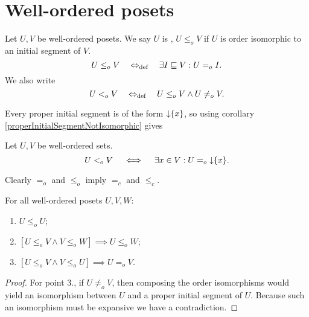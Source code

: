 \section{Well-ordered posets}
\begin{definition}
Let $U,V$ be well-ordered posets. We say $U$ is , $U\leq_o V$ if $U$ is order isomorphic to an initial segment of $V$.
\[ U\leq_o V \quad\Leftrightarrow_{\text{def}}\quad \exists I\sqsubseteq V: U =_o I. \]
We also write
\[ U <_o V \quad\Leftrightarrow_{\text{def}}\quad U\leq_o V \land U\neq_o V. \]
\end{definition}
Every proper initial segment is of the form $\operatorname{\downarrow}\{x\}$, so using corollary \ref{properInitialSegmentNotIsomorphic} gives
\begin{lemma}
Let $U,V$ be well-ordered sets.
\[ U <_o V \quad \iff \quad \exists x\in V: U =_o \operatorname{\downarrow}\{x\}. \]
\end{lemma}

Clearly $=_o$ and $\leq_o$ imply $=_c$ and $\leq_c$.

\begin{lemma} \label{preorderingWosets}
For all well-ordered posets $U,V,W$:
\begin{enumerate}
\item $U \leq_o U$;
\item $[U\leq_o V \land V\leq_o W] \implies U\leq_o W$;
\item $[U \leq_o V \land V \leq_o U] \implies U =_o V$.
\end{enumerate}
\end{lemma}
\begin{proof}
For point 3., if $U \neq_o V$, then composing the order isomorphisms would yield an isomorphism between $U$ and a proper initial segment of $U$. Because such an isomorphism must be expansive we have a contradiction.
\end{proof}

